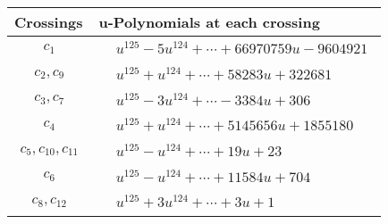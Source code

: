 \documentclass[1p]{elsarticle_modified}
\theoremstyle{definition}
\begin{document}
\begin{tabular}{m{50pt}|m{274pt}}
Crossings & \hspace{64pt}u-Polynomials at each crossing \\
\hline $$\begin{aligned}c_{1}\end{aligned}$$&$\begin{aligned}
&u^{125}-5 u^{124}+\cdots+66970759 u-9604921
\end{aligned}$\\
\hline $$\begin{aligned}c_{2},c_{9}\end{aligned}$$&$\begin{aligned}
&u^{125}+u^{124}+\cdots+58283 u+322681
\end{aligned}$\\
\hline $$\begin{aligned}c_{3},c_{7}\end{aligned}$$&$\begin{aligned}
&u^{125}-3 u^{124}+\cdots-3384 u+306
\end{aligned}$\\
\hline $$\begin{aligned}c_{4}\end{aligned}$$&$\begin{aligned}
&u^{125}+u^{124}+\cdots+5145656 u+1855180
\end{aligned}$\\
\hline $$\begin{aligned}c_{5},c_{10},c_{11}\end{aligned}$$&$\begin{aligned}
&u^{125}- u^{124}+\cdots+19 u+23
\end{aligned}$\\
\hline $$\begin{aligned}c_{6}\end{aligned}$$&$\begin{aligned}
&u^{125}- u^{124}+\cdots+11584 u+704
\end{aligned}$\\
\hline $$\begin{aligned}c_{8},c_{12}\end{aligned}$$&$\begin{aligned}
&u^{125}+3 u^{124}+\cdots+3 u+1
\end{aligned}$\\
\hline
\end{tabular}\\~\\
\end{document}

